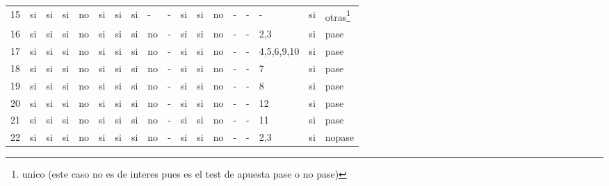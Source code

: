 \documentclass[a4paper, 10pt, notitlepage]{article}
\begin{document}
\begin{landscape}
\begin{tabularx}{1.6\textheight}{|X|X|X|X|X|X|X|X|X|X|X|X|X|X|X|X|X|X|}
15	&	si	&	si	&	si	&	no	&	si	&	si	&	si	&	-	&	-	&	si	&	si	&	no	&	-	&	-	&	-	&	si	&	otras\footnote{unico (este caso no es de interes pues es el test de apuesta pase o no pase)}\\
16	&	si	&	si	&	si	&	no	&	si	&	si	&	si	&	no	&	-	&	si	&	si	&	no	&	-	&	-	&	2,3	&	si	&	pase\\
17	&	si	&	si	&	si	&	no	&	si	&	si	&	si	&	no	&	-	&	si	&	si	&	no	&	-	&	-	&	4,5,6,9,10	&	si	&	pase\\
18	&	si	&	si	&	si	&	no	&	si	&	si	&	si	&	no	&	-	&	si	&	si	&	no	&	-	&	-	&	7	&	si	&	pase\\
19	&	si	&	si	&	si	&	no	&	si	&	si	&	si	&	no	&	-	&	si	&	si	&	no	&	-	&	-	&	8	&	si	&	pase\\
20	&	si	&	si	&	si	&	no	&	si	&	si	&	si	&	no	&	-	&	si	&	si	&	no	&	-	&	-	&	12	&	si	&	pase\\
21	&	si	&	si	&	si	&	no	&	si	&	si	&	si	&	no	&	-	&	si	&	si	&	no	&	-	&	-	&	11	&	si	&	pase\\
22	&	si	&	si	&	si	&	no	&	si	&	si	&	si	&	no	&	-	&	si	&	si	&	no	&	-	&	-	&	2,3	&	si	&	nopase\\
\hline
\end{tabularx}
\vskip1cm
\end{landscape}
\end{document}
